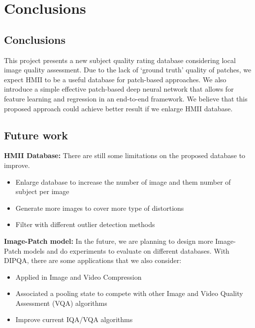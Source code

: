 \chapter{Conclusions}

\section{Conclusions}

This project presents a new subject quality rating database considering local image quality assessment. Due to the lack of \enquote*{ground truth} quality of patches, we expect HMII to be a useful database for patch-based approaches. We also introduce a simple effective patch-based deep neural network that allows for feature learning and regression in an end-to-end framework. We believe that this proposed approach could achieve better result if we enlarge HMII database.

\section{Future work}

\textbf{HMII Database:} There are still some limitations on the proposed database to improve. 

\begin{itemize}
  \item Enlarge database to increase the number of image and them number of subject per image
  \item Generate more images to cover more type of distortions 
  \item Filter with different outlier detection methods
\end{itemize}  

\textbf{Image-Patch model:} In the future, we are planning to design more Image-Patch models and do experiments to evaluate on different databases. With DIPQA, there are some applications that we also consider: 
\begin{itemize}
  \item Applied in Image and Video Compression
  \item Associated a pooling state to compete with other Image and Video Quality Assessment (VQA) algorithms
  \item Improve current IQA/VQA algorithms
\end{itemize}  

